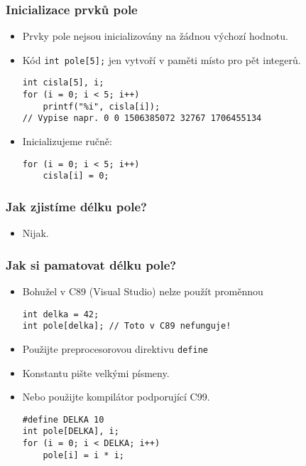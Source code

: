 \documentclass{beamer}
\newenvironment{itemizex}%
  {\large \begin{itemize}%
    \setlength{\itemsep}{8pt}%
    \setlength{\parskip}{8pt}}%
  {\end{itemize}}
\begin{document}
\begin{frame}[t,fragile]\frametitle{Inicializace prvků pole} 
  \begin{itemizex}
    \item Prvky pole nejsou inicializovány na žádnou výchozí hodnotu.
    \item Kód \texttt{int pole[5];} jen vytvoří v paměti místo pro pět integerů.
    \begin{verbatim} 
int cisla[5], i;
for (i = 0; i < 5; i++) 
    printf("%i", cisla[i]);
// Vypise napr. 0 0 1506385072 32767 1706455134
    \end{verbatim}
    \item Inicializujeme ručně:
    \begin{verbatim} 
for (i = 0; i < 5; i++) 
    cisla[i] = 0;
    \end{verbatim}
  \end{itemizex}
\end{frame}


\begin{frame}[t,fragile]\frametitle{Jak zjistíme délku pole?} 
    \begin{itemizex}
        \item Nijak.
    \end{itemizex}
\end{frame}


\begin{frame}[t,fragile]\frametitle{Jak si pamatovat délku pole?} 
    \begin{itemize}
        \item Bohužel v C89 (Visual Studio) nelze použít proměnnou
        \begin{verbatim} 
int delka = 42;
int pole[delka]; // Toto v C89 nefunguje!
        \end{verbatim}
        \item Použijte preprocesorovou direktivu \texttt{define}
        \item Konstantu pište velkými písmeny.
        \item Nebo použijte kompilátor podporující C99.
        \begin{verbatim} 
#define DELKA 10
int pole[DELKA], i;
for (i = 0; i < DELKA; i++) 
    pole[i] = i * i;
        \end{verbatim}
    \end{itemize}
\end{frame}
\end{document}
